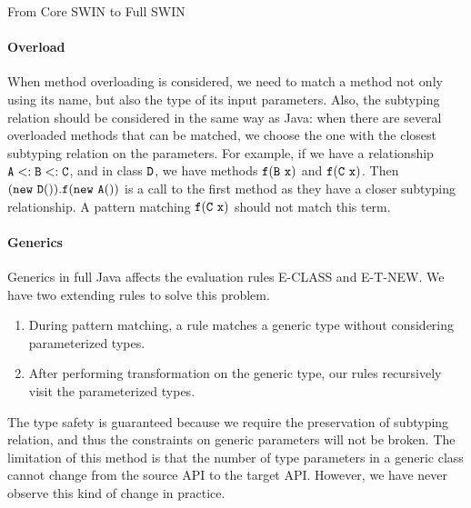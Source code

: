 \begin{section}{From Core SWIN to Full SWIN%
  }
\paragraph{Overload} %
When method overloading is considered, we need to match a method not
only using its name, but also the type of its input parameters. Also,
the subtyping relation should be considered in the same way as Java:
when there are several overloaded methods that can be matched, we
choose the one with the closest subtyping relation on the parameters. For
example, if we have a relationship $\tt A<:B<:C$, and in class $\tt
D$, we have methods $\tt f(B\ x)$ and $\tt f(C\ x)$. Then $\tt(new\ D()).f(new\
A())$ is a call to the first method as they have a closer
subtyping relationship. A pattern matching $\tt f(C\ x)$ should not match
this term.

\paragraph{Generics} Generics in full Java affects the evaluation rules E-CLASS
and E-T-NEW. We have two extending rules to solve this problem.
\begin{enumerate}
    \item During pattern matching, a rule matches a generic type without considering
        parameterized types.
    \item After performing transformation on the generic type, 
        our rules recursively visit the parameterized types.
\end{enumerate}
The type safety is guaranteed because we require the preservation of
subtyping relation, and thus the constraints on generic parameters
will not be broken. The limitation of this method is that the number
of type parameters in a generic class cannot change from the source
API to the target API. However, we have never observe this kind of
change in practice.
\end{section}


